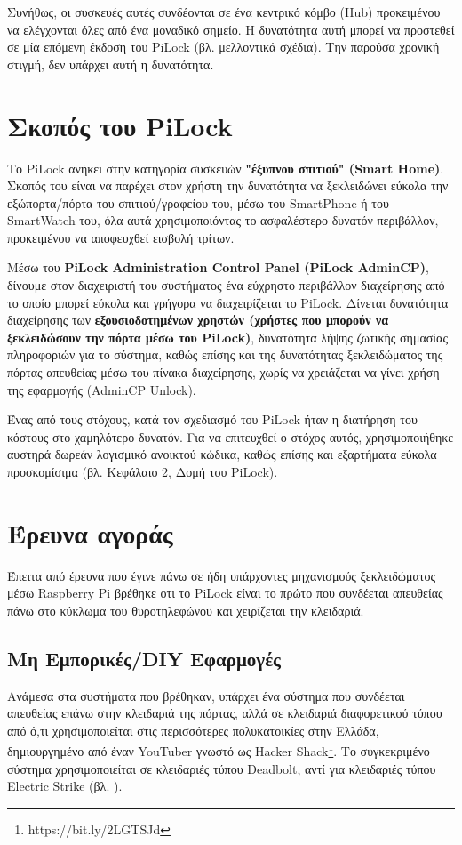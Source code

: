	Συνήθως, οι συσκευές αυτές συνδέονται σε ένα κεντρικό κόμβο (Hub) προκειμένου να ελέγχονται όλες από ένα μοναδικό σημείο. Η δυνατότητα αυτή μπορεί να προστεθεί σε μία επόμενη έκδοση του PiLock (βλ. μελλοντικά σχέδια). Την παρούσα χρονική στιγμή, δεν υπάρχει αυτή η δυνατότητα.

\section{Σκοπός του PiLock}
	Το PiLock ανήκει στην κατηγορία συσκευών \textbf{"έξυπνου σπιτιού" (Smart Home)}. Σκοπός του είναι να παρέχει στον χρήστη την δυνατότητα να ξεκλειδώνει εύκολα την εξώπορτα/πόρτα του σπιτιού/γραφείου του, μέσω του SmartPhone ή του SmartWatch του, όλα αυτά χρησιμοποιόντας το ασφαλέστερο δυνατόν περιβάλλον, προκειμένου να αποφευχθεί εισβολή τρίτων.

	Μέσω του \textbf{PiLock Administration Control Panel (PiLock AdminCP)}, δίνουμε στον διαχειριστή του συστήματος ένα εύχρηστο περιβάλλον διαχείρησης από το οποίο μπορεί εύκολα και γρήγορα να διαχειρίζεται το PiLock. Δίνεται δυνατότητα διαχείρησης των \textbf{εξουσιοδοτημένων χρηστών (χρήστες που μπορούν να ξεκλειδώσουν την πόρτα μέσω του PiLock)}, δυνατότητα λήψης ζωτικής σημασίας πληροφοριών για το σύστημα, καθώς επίσης και της δυνατότητας ξεκλειδώματος της πόρτας απευθείας μέσω του πίνακα διαχείρησης, χωρίς να χρειάζεται να γίνει χρήση της εφαρμογής (AdminCP Unlock).

	Ένας από τους στόχους, κατά τον σχεδιασμό του PiLock ήταν η διατήρηση του κόστους στο χαμηλότερο δυνατόν. Για να επιτευχθεί ο στόχος αυτός, χρησιμοποιήθηκε αυστηρά δωρεάν λογισμικό ανοικτού κώδικα, καθώς επίσης και εξαρτήματα εύκολα προσκομίσιμα (βλ. Κεφάλαιο 2, Δομή του PiLock).

\section{Έρευνα αγοράς}
	Έπειτα από έρευνα που έγινε πάνω σε ήδη υπάρχοντες μηχανισμούς ξεκλειδώματος μέσω Raspberry Pi βρέθηκε οτι το PiLock είναι το πρώτο που συνδέεται απευθείας πάνω στο κύκλωμα του θυροτηλεφώνου και χειρίζεται την κλειδαριά. 

	\subsection{Μη Εμπορικές/DIY Εφαρμογές}
		Ανάμεσα στα συστήματα που βρέθηκαν, υπάρχει ένα σύστημα που συνδέεται απευθείας επάνω στην κλειδαριά της πόρτας, αλλά σε κλειδαριά διαφορετικού τύπου από ό,τι χρησιμοποιείται στις περισσότερες πολυκατοικίες στην Ελλάδα, δημιουργημένο από έναν YouTuber γνωστό ως Hacker Shack\footnote{https://bit.ly/2LGTSJd}. Το συγκεκριμένο σύστημα χρησιμοποιείται σε κλειδαριές τύπου Deadbolt, αντί για κλειδαριές τύπου Electric Strike (βλ. ).

